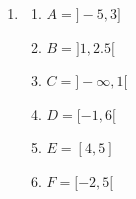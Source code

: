 \begin{enumerate}
    \item
          \begin{enumerate}
              \item \(A = ]-5,3]\)
              \item \(B = ]1,2.5[\)
              \item \(C = ]-\infty,1[\)
              \item \(D = [-1,6[\)
              \item \(E = [4,5]\)
              \item \(F = [-2,5[\)
          \end{enumerate}
\end{enumerate}



